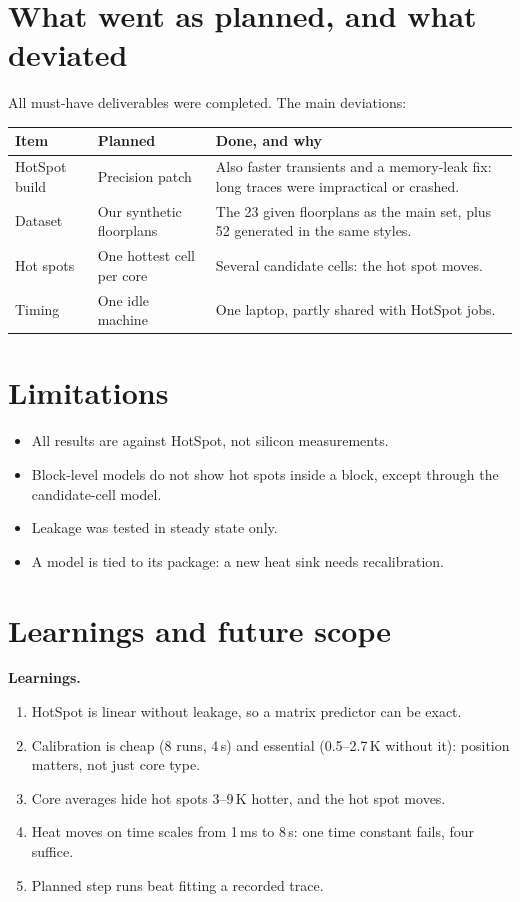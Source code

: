 \documentclass[11pt,a4paper]{article}
\begin{document}
\section{What went as planned, and what deviated}
All must-have deliverables were completed. The main deviations:
\begin{center}
\small
\begin{tabular}{@{}p{3cm} p{4.3cm} p{7.7cm}@{}}
\toprule
Item & Planned & Done, and why \\
\midrule
HotSpot build & Precision patch & Also faster transients and a memory-leak fix: long traces were impractical or crashed. \\
Dataset & Our synthetic floorplans & The 23 given floorplans as the main set, plus 52 generated in the same styles. \\
Hot spots & One hottest cell per core & Several candidate cells: the hot spot moves. \\
Timing & One idle machine & One laptop, partly shared with HotSpot jobs. \\
\bottomrule
\end{tabular}
\end{center}

\section{Limitations}
\begin{itemize}
  \item All results are against HotSpot, not silicon measurements.
  \item Block-level models do not show hot spots inside a block, except through the candidate-cell
        model.
  \item Leakage was tested in steady state only.
  \item A model is tied to its package: a new heat sink needs recalibration.
\end{itemize}

\section{Learnings and future scope}
\textbf{Learnings.}
\begin{enumerate}
  \item HotSpot is linear without leakage, so a matrix predictor can be exact.
  \item Calibration is cheap (8 runs, 4\,s) and essential (0.5--2.7\,K without it): position
        matters, not just core type.
  \item Core averages hide hot spots 3--9\,K hotter, and the hot spot moves.
  \item Heat moves on time scales from 1\,ms to 8\,s: one time constant fails, four suffice.
  \item Planned step runs beat fitting a recorded trace.
\end{enumerate}
\end{document}
